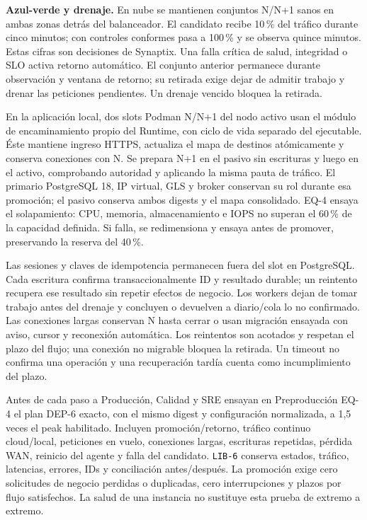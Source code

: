 \textbf{Azul-verde y drenaje.}
En nube se mantienen conjuntos N/N+1 sanos en ambas zonas detrás del balanceador. El candidato recibe 10\,\% del tráfico durante cinco minutos; con controles conformes pasa a 100\,\% y se observa quince minutos. Estas cifras son decisiones de Synaptix. Una falla crítica de salud, integridad o SLO activa retorno automático. El conjunto anterior permanece durante observación y ventana de retorno; su retirada exige dejar de admitir trabajo y drenar las peticiones pendientes. Un drenaje vencido bloquea la retirada.

En la aplicación local, dos slots Podman N/N+1 del nodo activo usan el módulo de encaminamiento propio del Runtime, con ciclo de vida separado del ejecutable. Éste mantiene ingreso HTTPS, actualiza el mapa de destinos atómicamente y conserva conexiones con N. Se prepara N+1 en el pasivo sin escrituras y luego en el activo, comprobando autoridad y aplicando la misma pauta de tráfico. El primario PostgreSQL 18, IP virtual, GLS y broker conservan su rol durante esa promoción; el pasivo conserva ambos digests y el mapa consolidado. EQ-4 ensaya el solapamiento: CPU, memoria, almacenamiento e IOPS no superan el 60\,\% de la capacidad definida. Si falla, se redimensiona y ensaya antes de promover, preservando la reserva del 40\,\%.

Las sesiones y claves de idempotencia permanecen fuera del slot en PostgreSQL. Cada escritura confirma transaccionalmente ID y resultado durable; un reintento recupera ese resultado sin repetir efectos de negocio. Los workers dejan de tomar trabajo antes del drenaje y concluyen o devuelven a diario/cola lo no confirmado. Las conexiones largas conservan N hasta cerrar o usan migración ensayada con aviso, cursor y reconexión automática. Los reintentos son acotados y respetan el plazo del flujo; una conexión no migrable bloquea la retirada. Un timeout no confirma una operación y una recuperación tardía cuenta como incumplimiento del plazo.

Antes de cada paso a Producción, Calidad y SRE ensayan en Preproducción EQ-4 el plan DEP-6 exacto, con el mismo digest y configuración normalizada, a 1,5 veces el peak habilitado. Incluyen promoción/retorno, tráfico continuo cloud/local, peticiones en vuelo, conexiones largas, escrituras repetidas, pérdida WAN, reinicio del agente y falla del candidato. \texttt{LIB-6} conserva estados, tráfico, latencias, errores, IDs y conciliación antes/después. La promoción exige cero solicitudes de negocio perdidas o duplicadas, cero interrupciones y plazos por flujo satisfechos. La salud de una instancia no sustituye esta prueba de extremo a extremo. \parencite[RT-04.07, p.~11]{sd6-bt}

